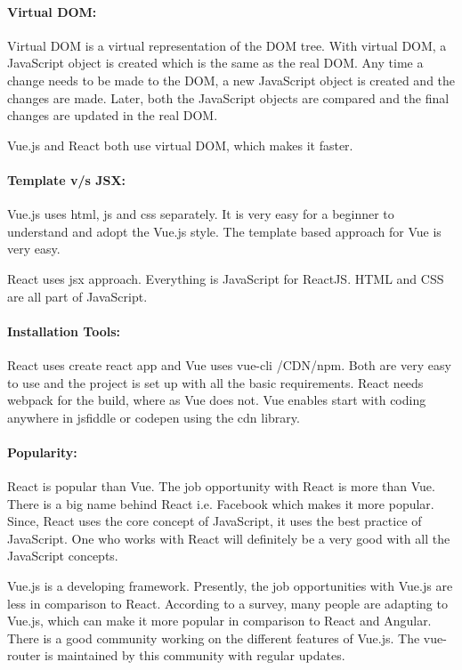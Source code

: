 \documentclass[12pt,a4paper,oneside]{report}
\begin{document}
\paragraph{Virtual DOM:}

Virtual DOM is a virtual representation of the DOM tree. With virtual DOM, a JavaScript object is created which is the same as the real DOM. Any time a change needs to be made to the DOM, a new JavaScript object is created and the changes are made. Later, both the JavaScript objects are compared and the final changes are updated in the real DOM.

Vue.js and React both use virtual DOM, which makes it faster.

\paragraph{Template v/s JSX:}

Vue.js uses html, js and css separately. It is very easy for a beginner to understand and adopt the Vue.js style. The template based approach for Vue is very easy.

React uses jsx approach. Everything is JavaScript for ReactJS. HTML and CSS are all part of JavaScript.

\paragraph{Installation Tools:}

React uses create react app and Vue uses vue-cli /CDN/npm. Both are very easy to use and the project is set up with all the basic requirements. React needs webpack for the build, where as Vue does not. Vue enables start with  coding anywhere in jsfiddle or codepen using the cdn library.

\paragraph{Popularity:}

React is popular than Vue. The job opportunity with React is more than Vue. There is a big name behind React i.e. Facebook which makes it more popular. Since, React uses the core concept of JavaScript, it uses the best practice of JavaScript. One who works with React will definitely be a very good with all the JavaScript concepts.

Vue.js is a developing framework. Presently, the job opportunities with Vue.js are less in comparison to React. According to a survey, many people are adapting to Vue.js, which can make it more popular in comparison to React and Angular. There is a good community working on the different features of Vue.js. The vue-router is maintained by this community with regular updates.
\end{document}
